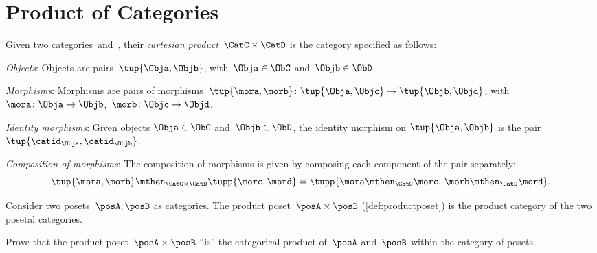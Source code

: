 

\section{Product of Categories}



\begin{ctdefinition}
    \label{def:cartesian-product-category}
    Given two categories~\CatC and~\CatD, their \emph{cartesian product}~$\CatC \times \CatD$ is the category specified as follows:
    \begin{compactenum}
        \item \emph{Objects}: Objects are pairs~$\tup{\Obja,\Objb}$, with~$\Obja\in \ObC$ and~$\Objb\in \ObD$.
        \item \emph{Morphisms}: Morphisms are pairs of morphisms~$\tup{\mora,\morb} \colon \tup{\Obja,\Objc}\to \tup{\Objb,\Objd}$, with~$\mora\colon \Obja \to \Objb$,~$\morb\colon \Objc\to \Objd$.
        \item \emph{Identity morphisms}: Given objects $\Obja\in \ObC$ and~$\Objb\in \ObD$, the identity morphism on $\tup{\Obja,\Objb}$ is the pair $\tup{\catid_\Obja ,\catid_\Objb}$.
        \item \emph{Composition of morphisms}: The composition of morphisms is given by composing each component of the pair separately:
        \begin{equation}
            \tup{\mora,\morb}\mthen_{\CatC\times\CatD} \tupp{\morc,\mord}=\tupp{\mora\mthen_{\CatC}\morc,\, \morb \mthen_{\CatD} \mord}.
        \end{equation}
    \end{compactenum}
\end{ctdefinition}


\begin{example}
    Consider two posets~$\posA,\posB$ as categories.
    The product poset~$\posA\times \posB$ (\cref{def:productposet}) is the product category of the two posetal categories.
\end{example}

\begin{gradedexercise}
    Prove that the product poset~$\posA \times \posB$ ``is'' the categorical product of~$\posA$ and~$\posB$ within the category of posets.
\end{gradedexercise}



